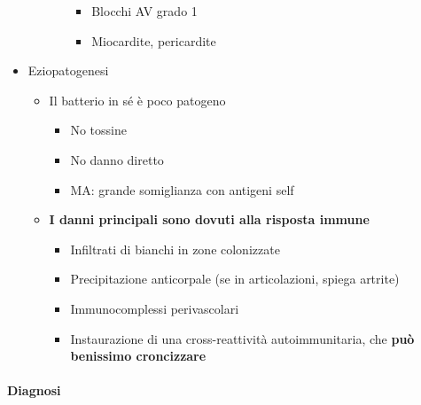 \documentclass[italian,]{article}
\providecommand{\tightlist}{%
  \setlength{\itemsep}{0pt}\setlength{\parskip}{0pt}}
\begin{document}
\begin{itemize}
\begin{enumerate}
\begin{itemize}
      \begin{itemize}
      \tightlist
      \item
        Blocchi AV grado 1
      \item
        Miocardite, pericardite
      \end{itemize}
    \end{itemize}
  \end{enumerate}
\item
  Eziopatogenesi

  \begin{itemize}
  \tightlist
  \item
    Il batterio in sé è poco patogeno

    \begin{itemize}
    \tightlist
    \item
      No tossine
    \item
      No danno diretto
    \item
      MA: grande somiglianza con antigeni self
    \end{itemize}
  \item
    \textbf{I danni principali sono dovuti alla risposta immune}

    \begin{itemize}
    \tightlist
    \item
      Infiltrati di bianchi in zone colonizzate
    \item
      Precipitazione anticorpale (se in articolazioni, spiega artrite)
    \item
      Immunocomplessi perivascolari
    \item
      Instaurazione di una cross-reattività autoimmunitaria, che
      \textbf{può benissimo croncizzare}
    \end{itemize}
  \end{itemize}
\end{itemize}

\hypertarget{diagnosi-3}{%
\paragraph{Diagnosi}\label{diagnosi-3}}
\end{document}
